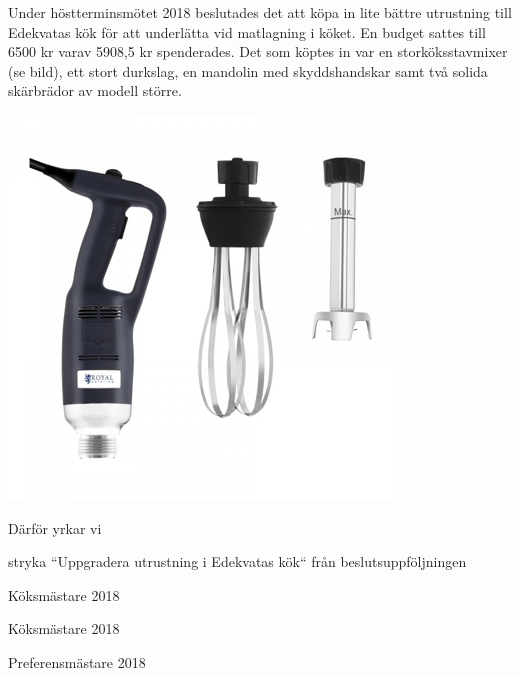 \documentclass[../_main/handlingar.tex]{subfiles}
\begin{document}
\beslutsuppfoljning{}

    Under höstterminsmötet 2018 beslutades det att köpa in lite bättre utrustning till Edekvatas
    kök för att underlätta vid matlagning i köket. En budget sattes till 6500 kr varav 5908,5 kr
    spenderades. Det som köptes in var en storköksstavmixer (se bild), ett stort durkslag, en
    mandolin med skyddshandskar samt två solida skärbrädor av modell större. 


    \begin{center}
     \includegraphics[scale=1]{../_res/mixer.png}
    \end{center}


    Därför yrkar vi
\begin{attsatser}
    \att stryka “Uppgradera utrustning i Edekvatas kök“ från beslutsuppföljningen
\end{attsatser}

\begin{signatures}{3}
    \signature{Filip Larsson}{Köksmästare 2018}
    \signature{Fredrik Berg}{Köksmästare 2018}
    \signature{Y Nhi Pham}{Preferensmästare 2018}
\end{signatures}
\end{document}
